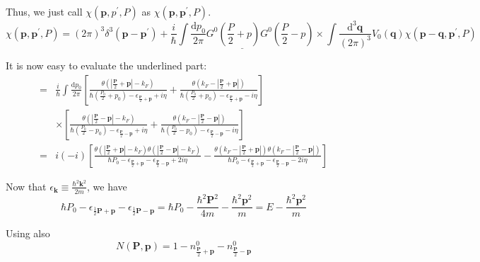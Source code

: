 Thus, we just call $\chi(\mathbf{p},p^{'},P)$ as $\chi(\mathbf{p},\mathbf{p}^{'},P)$.
\begin{equation} \label{Eqs2.7.14}
\chi(\mathbf{p},\mathbf{p}^{'},P) = (2\pi)^3 \delta^3(\mathbf{p}-\mathbf{p}^{'}) + \underline{\frac{i}{\hbar} \int \frac{\mathrm{d}p_0}{2\pi} G^0(\frac{P}{2}+p)G^0(\frac{P}{2}-p)}\times\int\frac{\mathrm{d}^3 \mathbf{q}}{(2\pi)^3}V_0(\mathbf{q}) \chi(\mathbf{p}-\mathbf{q},\mathbf{p}^{'},P)
\end{equation}

It is now easy to evaluate the underlined part:
\[\begin{split} =& \frac{i}{\hbar} \int \frac{\mathrm{d}p_0}{2\pi} \left[ \frac{\theta(|\frac{\mathbf{P}}{2}+\mathbf{p}|-k_F)}{\hbar(\frac{P_0}{2}+p_0)-\epsilon_{\frac{\mathbf{P}}{2}+\mathbf{p}}+i\eta} + \frac{\theta(k_F-|\frac{\mathbf{P}}{2}+\mathbf{p}|)}{\hbar(\frac{P_0}{2}+p_0)-\epsilon_{\frac{\mathbf{P}}{2}+\mathbf{p}}-i\eta} \right] \\
& \times \left[ \frac{\theta(|\frac{\mathbf{P}}{2}-\mathbf{p}|-k_F)}{\hbar(\frac{P_0}{2}-p_0)-\epsilon_{\frac{\mathbf{P}}{2}-\mathbf{p}}+i\eta} + \frac{\theta(k_F-|\frac{\mathbf{P}}{2}-\mathbf{p}|)}{\hbar(\frac{P_0}{2}-p_0)-\epsilon_{\frac{\mathbf{P}}{2}-\mathbf{p}}-i\eta} \right]\\
=& i (-i) \left[ \frac{\theta(|\frac{\mathbf{P}}{2}+\mathbf{p}|-k_F)\theta(|\frac{\mathbf{P}}{2}-\mathbf{p}|-k_F)}{\hbar P_0 - \epsilon_{\frac{\mathbf{P}}{2}+\mathbf{p}} - \epsilon_{\frac{\mathbf{P}}{2}-\mathbf{p}} + 2i\eta} - \frac{\theta(k_F-|\frac{\mathbf{P}}{2}+\mathbf{p}|)\theta(k_F-|\frac{\mathbf{P}}{2}-\mathbf{p}|)}{\hbar P_0 - \epsilon_{\frac{\mathbf{P}}{2}+\mathbf{p}} - \epsilon_{\frac{\mathbf{P}}{2}-\mathbf{p}} - 2i\eta} \right]
\end{split} \]

Now that $\epsilon_\mathbf{k} \equiv \frac{\hbar^2\mathbf{k}^2}{2m}$, we have
\begin{equation*} \label{Eqs2.7.15'}\hbar P_0 - \epsilon_{\frac{1}{2}\mathbf{P}+\mathbf{p}}- \epsilon_{\frac{1}{2}\mathbf{P}-\mathbf{p}} = \hbar P_0 - \frac{\hbar^2\mathbf{P}^2}{4m}-\frac{\hbar^2\mathbf{p}^2}{m}=E-\frac{\hbar^2\mathbf{p}^2}{m}\tag{2.7.15'}\end{equation*}

Using also
\begin{equation} \label{Eqs2.7.15}
N(\mathbf{P},\mathbf{p}) = 1-n^0_{\frac{\mathbf{P}}{2}+\mathbf{p}}-n^0_{\frac{\mathbf{P}}{2}-\mathbf{p}} \end{equation}

